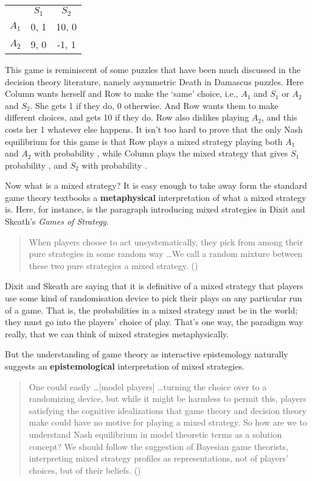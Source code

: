 \documentclass[
  11pt,
  letterpaper,
  DIV=11,
  numbers=noendperiod,
  twoside]{scrartcl}
\begin{document}
\newpage

\begin{longtable}[]{@{}lcc@{}}
\toprule\noalign{}
\endhead
\bottomrule\noalign{}
\endlastfoot
& \(S_1\) & \(S_2\) \\
\(A_1\) & 0, 1 & 10, 0 \\
\(A_2\) & 9, 0 & -1, 1 \\
\end{longtable}

This game is reminiscent of some puzzles that have been much discussed
in the decision theory literature, namely asymmetric Death in Damascus
puzzles. Here Column wants herself and Row to make the `same' choice,
i.e., \(A_1\) and \(S_1\) or \(A_2\) and \(S_2\). She gets 1 if they do,
0 otherwise. And Row wants them to make different choices, and gets 10
if they do. Row also dislikes playing \(A_2\), and this costs her 1
whatever else happens. It isn't too hard to prove that the only Nash
equilibrium for this game is that Row plays a mixed strategy playing
both \(A_1\) and \(A_2\) with probability , while Column plays the mixed
strategy that gives \(S_1\) probability , and \(S_2\) with probability .

Now what is a mixed strategy? It is easy enough to take away form the
standard game theory textbooks a \textbf{metaphysical} interpretation of
what a mixed strategy is. Here, for instance, is the paragraph
introducing mixed strategies in Dixit and Skeath's \emph{Games of
Strategy}.

\begin{quote}
When players choose to act unsystematically, they pick from among their
pure strategies in some random way \ldots We call a random mixture
between these two pure strategies a mixed strategy.
()
\end{quote}

Dixit and Skeath are saying that it is definitive of a mixed strategy
that players use some kind of randomisation device to pick their plays
on any particular run of a game. That is, the probabilities in a mixed
strategy must be in the world; they must go into the players' choice of
play. That's one way, the paradigm way really, that we can think of
mixed strategies metaphysically.

But the understanding of game theory as interactive epistemology
naturally suggests an \textbf{epistemological} interpretation of mixed
strategies.

\begin{quote}
One could easily \ldots{[}model players{]} \ldots turning the choice
over to a randomizing device, but while it might be harmless to permit
this, players satisfying the cognitive idealizations that game theory
and decision theory make could have no motive for playing a mixed
strategy. So how are we to understand Nash equilibrium in model
theoretic terms as a solution concept? We should follow the suggestion
of Bayesian game theorists, interpreting mixed strategy profiles as
representations, not of players' choices, but of their beliefs.
()
\end{quote}
\end{document}
